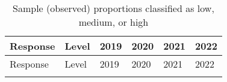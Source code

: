 \documentclass[
  single column]{article}
\begin{document}
\begin{longtable}[]{@{}
  >{\raggedright\arraybackslash}p{}
  >{\raggedright\arraybackslash}p{}
  >{\raggedright\arraybackslash}p{}
  >{\raggedright\arraybackslash}p{}
  >{\raggedright\arraybackslash}p{}
  >{\raggedright\arraybackslash}p{}@{}}
\caption{Sample (observed) proportions classified as low, medium, or
high}\label{tbl-sample-cat}\tabularnewline
\toprule\noalign{}
\begin{minipage}[b]{\linewidth}\raggedright
Response
\end{minipage} & \begin{minipage}[b]{\linewidth}\raggedright
Level
\end{minipage} & \begin{minipage}[b]{\linewidth}\raggedright
2019
\end{minipage} & \begin{minipage}[b]{\linewidth}\raggedright
2020
\end{minipage} & \begin{minipage}[b]{\linewidth}\raggedright
2021
\end{minipage} & \begin{minipage}[b]{\linewidth}\raggedright
2022
\end{minipage} \\
\midrule\noalign{}
\endfirsthead
\toprule\noalign{}
\begin{minipage}[b]{\linewidth}\raggedright
Response
\end{minipage} & \begin{minipage}[b]{\linewidth}\raggedright
Level
\end{minipage} & \begin{minipage}[b]{\linewidth}\raggedright
2019
\end{minipage} & \begin{minipage}[b]{\linewidth}\raggedright
2020
\end{minipage} & \begin{minipage}[b]{\linewidth}\raggedright
2021
\end{minipage} & \begin{minipage}[b]{\linewidth}\raggedright
2022
\end{minipage} \\
\midrule\noalign{}
\endhead
\bottomrule\noalign{}

\end{longtable}
\end{document}
